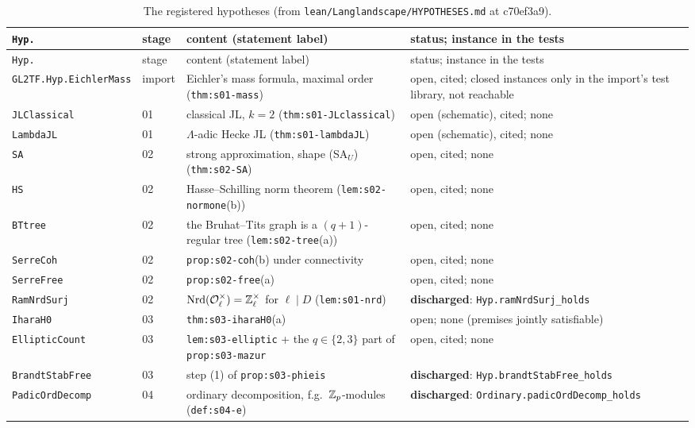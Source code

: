 \begin{longtable}{@{}p{} p{} p{} p{}@{}}
\caption{The \NumHypRegistered{} registered hypotheses (from \texttt{lean/Langlandscape/HYPOTHESES.md} at c70ef3a9).}\label{tab:hyps}\\
\toprule \texttt{Hyp.} & stage & content (statement label) & status; instance in the tests\\\midrule\endfirsthead
\toprule \texttt{Hyp.} & stage & content (statement label) & status; instance in the tests\\\midrule\endhead
\texttt{GL2TF.Hyp.EichlerMass} & import & Eichler's mass formula, maximal order (\texttt{thm:s01-mass}) & open, cited; closed instances only in the import's test library, not reachable\\
\texttt{JLClassical} & 01 & classical JL, $k=2$ (\texttt{thm:s01-JLclassical}) & open (schematic), cited; none\\
\texttt{LambdaJL} & 01 & $\Lambda$-adic Hecke JL (\texttt{thm:s01-lambdaJL}) & open (schematic), cited; none\\
\texttt{SA} & 02 & strong approximation, shape (SA$_U$) (\texttt{thm:s02-SA}) & open, cited; none\\
\texttt{HS} & 02 & Hasse--Schilling norm theorem (\texttt{lem:s02-normone}(b)) & open, cited; none\\
\texttt{BTtree} & 02 & the Bruhat--Tits graph is a $(q+1)$-regular tree (\texttt{lem:s02-tree}(a)) & open, cited; none\\
\texttt{SerreCoh} & 02 & \texttt{prop:s02-coh}(b) under connectivity & open, cited; none\\
\texttt{SerreFree} & 02 & \texttt{prop:s02-free}(a) & open, cited; none\\
\texttt{RamNrdSurj} & 02 & $\mathrm{Nrd}(\mathcal{O}_\ell^\times)=\mathbb{Z}_\ell^\times$ for $\ell\mid D$ (\texttt{lem:s01-nrd}) & \textbf{discharged}: \texttt{Hyp.ramNrdSurj\_holds}\\
\texttt{IharaH0} & 03 & \texttt{thm:s03-iharaH0}(a) & open; none (premises jointly satisfiable)\\
\texttt{EllipticCount} & 03 & \texttt{lem:s03-elliptic} + the $q\in\{2,3\}$ part of \texttt{prop:s03-mazur} & open, cited; none\\
\texttt{BrandtStabFree} & 03 & step (1) of \texttt{prop:s03-phieis} & \textbf{discharged}: \texttt{Hyp.brandtStabFree\_holds}\\
\texttt{PadicOrdDecomp} & 04 & ordinary decomposition, f.g.\ $\mathbb{Z}_p$-modules (\texttt{def:s04-e}) & \textbf{discharged}: \texttt{Ordinary.padicOrdDecomp\_holds}\\

\end{longtable}

